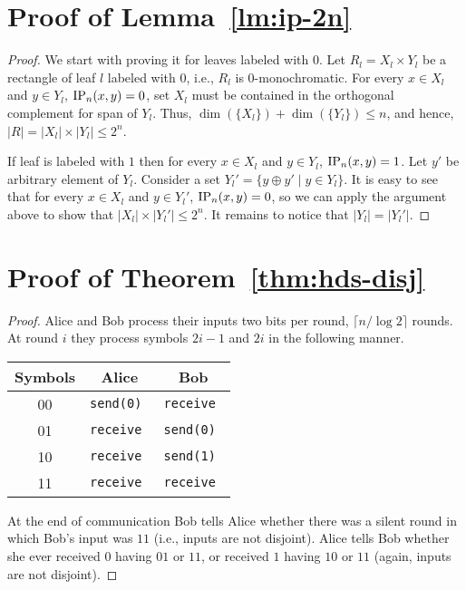\appendix
\section{Proof of Lemma~\ref{lm:ip-2n}}
\begin{proof}
	We start with proving it for leaves labeled with $0$.
	Let $R_l = X_l \times Y_l$ be a rectangle of leaf $l$ labeled with $0$,
	i.e., $R_l$ is $0$-monochromatic. For every $x\in X_l$ and $y\in Y_l$, $\mathrm{IP}_n(x,y) = 0$,
	set $X_l$ must be contained in the orthogonal complement for span of $Y_l$. Thus,
	$\dim(\{X_l\}) + \dim(\{Y_l\})\le n$, and hence, $|R| = |X_l|\times|Y_l| \le 2^n$.
	
	If leaf is labeled with $1$ then 
	for every $x\in X_l$ and $y\in Y_l$, $\mathrm{IP}_n(x,y) = 1$.
	Let $y'$ be arbitrary element of $Y_l$. 
	Consider a set $Y_l' = \{y \oplus y'\mid y\in Y_l\}$.
	It is easy to see that for every $x\in X_l$ and $y\in Y_l'$, $\mathrm{IP}_n(x,y) = 0$, so we can apply
	the argument above to show that $|X_l|\times|Y_l'| \le 2^n$. It remains to notice that $|Y_l| = |Y_l'|$.
\end{proof}

\section{Proof of Theorem~\ref{thm:hds-disj}}
\begin{proof}
Alice and Bob process their inputs two bits per round, $\lceil n/\log 2\rceil$ rounds. 
At round $i$ they process symbols $2i - 1$ and $2i$ in the following manner.
\begin{center}
\begin{tabular}{c|c|c}
\bf Symbols & \bf Alice & \bf Bob \\\hline 
00 & \tt send(0)  & \tt receive   \\\hline
01 & \tt receive  & \tt send(0)   \\\hline
10 & \tt receive  & \tt send(1) \\\hline
11 & \tt receive  & \tt receive 
\end{tabular}
\end{center}
At the end of communication Bob tells Alice whether there was a silent round in which
Bob's input was $11$ (i.e., inputs are not disjoint). Alice tells Bob whether she ever
received $0$ having $01$ or $11$, or received $1$ having $10$ or $11$ (again, inputs are not disjoint).
\end{proof}

